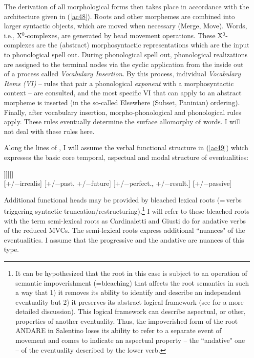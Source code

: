 \documentclass[output=paper]{langscibook}
\begin{document}
The derivation of all morphological forms then takes place in accordance with the architecture given in (\ref{ac48}). Roots and other morphemes are combined into larger syntactic objects, which are moved when necessary (Merge, Move). Words, i.e., X$^0$-complexes, are generated by head movement operations. These X$^0$-com\-plexes are the (abstract) morphosyntactic representations which are the input to phonological spell out.  During phonological spell out, phonological realizations are assigned to the terminal nodes via the cyclic application from the inside out of a process called \textit{Vocabulary Insertion}. By this process, individual \textit{Vocabulary Items (VI)}  --  rules that pair a phonological \textit{exponent} with a morphosyntactic context -- are consulted, and the most specific VI that can apply to an abstract morpheme is inserted (in the so-called Elsewhere (Subset, Paninian) ordering).  Finally, after vocabulary insertion, morpho-phonological and phonological rules apply.  These rules eventually determine the surface allomorphy of words.  I will not deal with these rules here.

Along the lines of \citet{wurmbrand2015}, I will assume the verbal functional structure in (\ref{ac49}) which expresses the basic core temporal, aspectual and modal structure of eventualities:

\ea \label{ac49}
\gll [\textsubscript{MoodP} Mood$^0$ [\textsubscript{TenseP} T$^0$ [\textsubscript{AspP} Asp$^0$ [\textsubscript{VoiceP} Voice$^0$ [\textsubscript{vP} v$^0$ [\textsubscript{√p} √Root$^0$ ]]]]]]\\
     {} [+/−irrealis] {} {[+/−past, +/−future]} {}  {[+/−perfect., +/−result.]} {} [+/−passive] {} {} {} {} {}\\
\z

Additional functional heads may be provided by bleached lexical roots (=\,verbs triggering syntactic truncation\slash restructuring).\footnote{It can be hypothesized that the root in this case is subject to an operation of semantic impoverishment (=bleaching) that affects the root semantics in such a way that 1) it removes its ability to identify and describe an independent eventuality but 2) it preserves its abstract logical framework (see \citealt{roberts2010a} for a more detailed discussion).  This logical framework can describe aspectual, or other, properties of another eventuality.  Thus, the impoverished form of the root ANDARE in Salentino loses its ability to refer to a separate event of movement and comes to indicate an aspectual property -- the “andative" one -- of the eventuality described by the lower verb.}  I will refer to these bleached roots with the term semi-lexical roots as Cardinaletti and Giusti do for andative verbs of the reduced MVCs. The semi-lexical roots express additional ``nuances" of the eventualities.   I assume that the progressive and the andative are nuances of this type.
\end{document}
